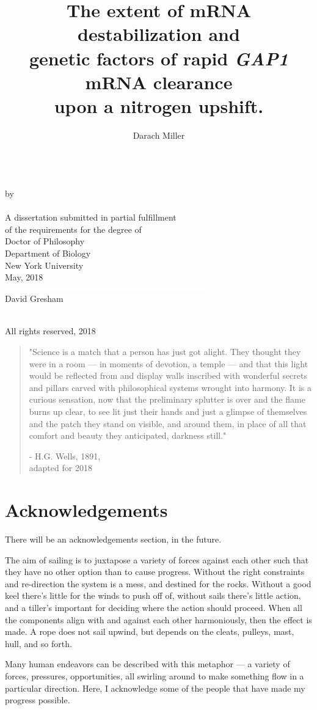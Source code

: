 \documentclass[12pt,letterpaper]{memoir}
\title{
The extent of mRNA destabilization and 
\\genetic factors of rapid \textit{GAP1} mRNA clearance 
\\upon a nitrogen upshift.
}
\author{Darach Miller}
\makeatletter
\def\makemytitle{
  \newpage
\begin{center}
\vfill
  \@title\\
\vfill
  by\\
\vfill
  \@author\\
\vfill
  A dissertation submitted in partial fulfillment \\
  of the requirements for the degree of \\
  Doctor of Philosophy \\
  Department of Biology \\
  New York University \\
\vfill
  \monthz, \yearz\\
  \end{center}
\vfill
\begin{flushright}
  $\rule{3.25in}{0.01mm}$\\
  David Gresham
\end{flushright}
  \pagebreak
\begin{center}
  \textcopyright \hspace{0.2em} \@author \\
  All rights reserved, \yearz \\
\end{center}
  \pagebreak
}
\def\monthz{May}
\def\yearz{2018}
\makeatother
\begin{document}
\DoubleSpacing
\frontmatter
\pagestyle{empty}

\makemytitle

\iftrue
\begin{quote}
\SingleSpace
"Science is a match that a person has just got alight. 
They thought they were in a room --- 
in moments of devotion, a temple --- 
and that this light would be reflected from and display walls 
inscribed with wonderful secrets and pillars carved with 
philosophical systems wrought into harmony. 
\vfill
It is a curious sensation, now that the preliminary splutter is 
over and the flame burns up clear, to see lit just their hands and 
just a glimpse of themselves and the patch they stand on visible, and 
around them, in place of all that comfort and beauty they
anticipated, \vspace{0.5em} darkness still."

\hfill - H.G. Wells, 1891, \\\vspace{1em}\hfill adapted for 2018
\end{quote}
\fi

\newpage

\section*{Acknowledgements}

\label{section:acknow}

There will be an acknowledgements section, in the future.

\iffalse

The aim of sailing is to juxtapose a variety of forces against 
each other such that they have no other option than to cause progress.
Without the right constraints and re-direction the system is a 
mess, and destined for the rocks.
Without a good keel there's little for the winds to push off of,
without sails there's little action, and a tiller's important for
deciding where the action should proceed.
When all the components align with and against each
other harmoniously, then the effect is made. 
A rope does not sail upwind, but depends on the cleats, pulleys,
mast, hull, and so forth.

Many human endeavors can be described with 
this metaphor --- a variety of forces, pressures, opportunities, 
all swirling around to make something flow in a particular
direction. 
Here, I acknowledge some of the people that have 
made my progress possible.
\end{document}

